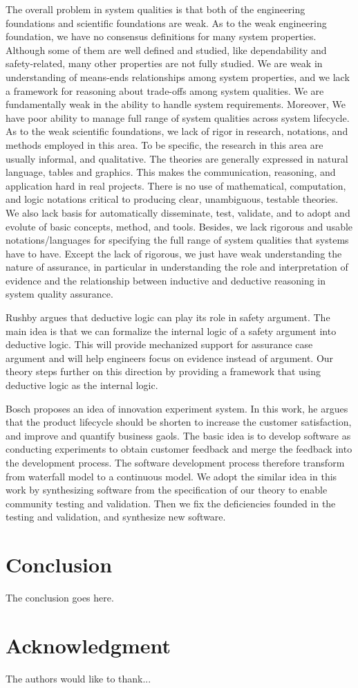 \documentclass[conference]{IEEEtran}
\begin{document}
The overall problem in system qualities is that both of the engineering foundations and scientific foundations are weak. As to the weak engineering foundation, we have no consensus definitions for many system properties. Although some of them are well defined and studied, like dependability and safety-related, many other properties are not fully studied. We are weak in understanding of means-ends relationships among system properties, and we lack a framework for reasoning about trade-offs among system qualities. We are fundamentally weak in the ability to handle system requirements. Moreover, We have poor ability to manage full range of system qualities across system lifecycle.  As to the weak scientific foundations, we lack of rigor in research, notations, and methods employed in this area. To be specific, the research in this area are usually informal, and qualitative. The theories are generally expressed in natural language, tables and graphics. This makes the communication, reasoning, and application hard in real projects. There is no use of mathematical, computation, and logic notations critical to producing clear, unambiguous, testable theories. We also lack basis for automatically disseminate, test, validate, and to adopt and evolute of basic concepts, method, and tools. Besides, we lack rigorous and usable notations/languages for specifying the full range of system qualities that systems have to have. Except the lack of rigorous, we just have weak understanding the nature of assurance, in particular in understanding the role and interpretation of evidence and the relationship between inductive and deductive reasoning in system quality assurance.

Rushby \cite{Rushby:formalism} argues that deductive logic can play its role in safety argument. The main idea is that we can formalize the internal logic of a safety argument into deductive logic. This will provide mechanized support for assurance case argument and will help engineers focus on evidence instead of argument. Our theory steps further on this direction by providing a framework that using deductive logic as the internal logic.

Bosch \cite{Bosch:innovation} proposes an idea of innovation experiment system. In this work, he argues that the product lifecycle should be shorten to increase the customer satisfaction, and improve and quantify business gaols. The basic idea is to develop software as conducting experiments to obtain customer feedback and merge the feedback into the development process. The software development process therefore transform from waterfall model to a continuous model. We adopt the similar idea in this work by synthesizing software from the specification of our theory to enable community testing and validation. Then we fix the deficiencies founded in the testing and validation, and synthesize new software.

\section{Conclusion}
The conclusion goes here.


\section*{Acknowledgment}
The authors would like to thank...

{}


\end{document}
